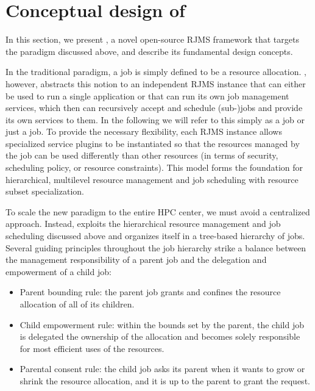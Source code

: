 \section{Conceptual design of \flux}
\label{models}

In this section, we present \flux, a novel open-source RJMS framework that
targets the paradigm discussed above, and describe its
%
fundamental design
concepts.

\vspace{1ex}
 In the traditional paradigm, 
a job is simply defined to be a resource allocation. 
\flux, however, abstracts this notion to an independent 
RJMS instance that can either be used to run a single application
or that can 
run its own job management services,
which then can recursively accept and schedule (sub-)jobs and provide its own 
services to them. 
In the following we will refer to this simply as a \flux job or just a job.
To provide the necessary flexibility,
each RJMS instance 
allows specialized service
plugins to be instantiated so that the resources managed by the \flux job
can be used differently than other resources (in terms of security, scheduling policy, or resource constraints).
This model forms 
the foundation for hierarchical,
multilevel resource management and job scheduling
with resource subset specialization.

\vspace{1ex}
 To scale the new paradigm 
to the entire HPC center, we must avoid a centralized approach. 
Instead, \flux exploits the hierarchical resource management 
and job scheduling discussed above and organizes itself in a tree-based hierarchy of \flux jobs. 
Several guiding principles throughout the job hierarchy strike 
a balance between the management responsibility 
of a parent job and the delegation and empowerment of a child job:

\begin{itemize}
\item{Parent bounding rule: the parent job grants 
and confines the resource allocation of all of its children.}

\item{Child empowerment rule: within the bounds set 
by the parent, the child job is delegated the ownership 
of the allocation and becomes solely responsible 
for most efficient uses of the resources.}

\item{Parental consent rule: the child job asks 
its parent when it wants to grow or shrink the resource 
allocation, and it is up to the parent to grant the request.}
\end{itemize}

